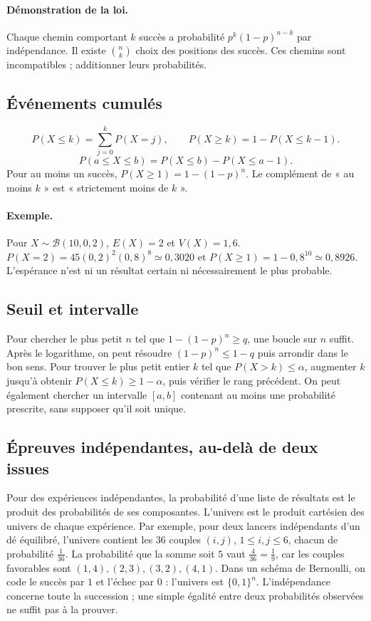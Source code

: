 \paragraph{Démonstration de la loi.} Chaque chemin comportant $k$ succès a probabilité $p^k(1-p)^{n-k}$ par indépendance. Il existe $\binom nk$ choix des positions des succès. Ces chemins sont incompatibles ; additionner leurs probabilités.
\subsection{Événements cumulés}
\[P(X\le k)=\sum_{j=0}^kP(X=j),\qquad P(X\ge k)=1-P(X\le k-1).\]\[P(a\le X\le b)=P(X\le b)-P(X\le a-1).\]
Pour au moins un succès, $P(X\ge1)=1-(1-p)^n$. Le complément de « au moins $k$ » est « strictement moins de $k$ ».
\paragraph{Exemple.} Pour $X\sim\mathcal B(10,0{,}2)$, $E(X)=2$ et $V(X)=1{,}6$. $P(X=2)=45(0{,}2)^2(0{,}8)^8\simeq0{,}3020$ et $P(X\ge1)=1-0{,}8^{10}\simeq0{,}8926$. L'espérance n'est ni un résultat certain ni nécessairement le plus probable.
\subsection{Seuil et intervalle}
Pour chercher le plus petit $n$ tel que $1-(1-p)^n\ge q$, une boucle sur $n$ suffit. Après le logarithme, on peut résoudre $(1-p)^n\le1-q$ puis arrondir dans le bon sens.
Pour trouver le plus petit entier $k$ tel que $P(X>k)\le\alpha$, augmenter $k$ jusqu'à obtenir $P(X\le k)\ge1-\alpha$, puis vérifier le rang précédent. On peut également chercher un intervalle $[a,b]$ contenant au moins une probabilité prescrite, sans supposer qu'il soit unique.
\subsection{Épreuves indépendantes, au-delà de deux issues}
Pour des expériences indépendantes, la probabilité d'une liste de résultats est le produit des probabilités de ses composantes. L'univers est le produit cartésien des univers de chaque expérience. Par exemple, pour deux lancers indépendants d'un dé équilibré, l'univers contient les $36$ couples $(i,j)$, $1\le i,j\le6$, chacun de probabilité $\frac{1}{36}$. La probabilité que la somme soit $5$ vaut $\frac{4}{36}=\frac{1}{9}$, car les couples favorables sont $(1,4),(2,3),(3,2),(4,1)$.
Dans un schéma de Bernoulli, on code le succès par $1$ et l'échec par $0$ : l'univers est $\{0,1\}^n$. L'indépendance concerne toute la succession ; une simple égalité entre deux probabilités observées ne suffit pas à la prouver.


